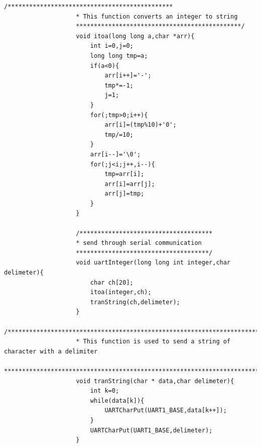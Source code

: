 \documentclass[a4paper,10pt,oneside]{article}
\begin{document}
\begin{lstlisting}[style=CStyle]
					/**********************************************
					* This function converts an integer to string
					**********************************************/
					void itoa(long long a,char *arr){
						int i=0,j=0;
						long long tmp=a;
						if(a<0){
							arr[i++]='-';
							tmp*=-1;
							j=1;
						}
						for(;tmp>0;i++){
							arr[i]=(tmp%10)+'0';
							tmp/=10;
						}
						arr[i--]='\0';
						for(;j<i;j++,i--){
							tmp=arr[i];
							arr[i]=arr[j];
							arr[j]=tmp;
						}
					}
					
					/*************************************
					* send through serial communication
					*************************************/
					void uartInteger(long long int integer,char delimeter){
						char ch[20];
						itoa(integer,ch);
						tranString(ch,delimeter);
					}
					/***********************************************************************
					* This function is used to send a string of character with a delimiter
					***********************************************************************/
					void tranString(char * data,char delimeter){
						int k=0;
						while(data[k]){
							UARTCharPut(UART1_BASE,data[k++]);
						}
						UARTCharPut(UART1_BASE,delimeter);
					}
					

\end{lstlisting}
\end{document}
